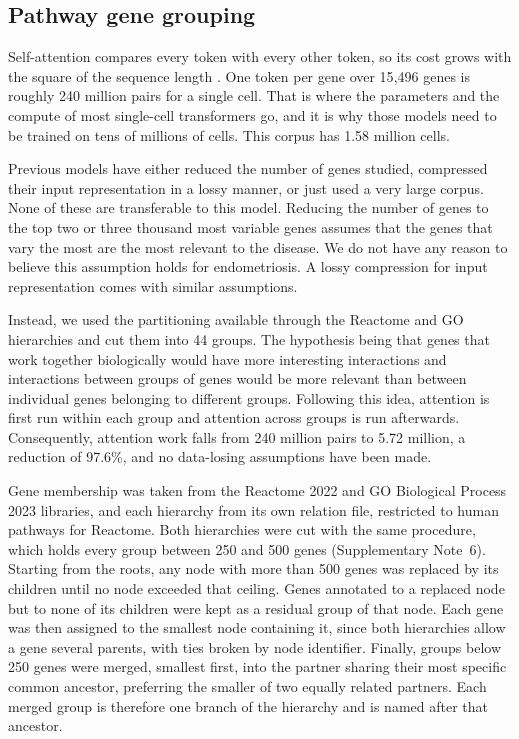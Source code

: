 \subsection*{Pathway gene grouping}

Self-attention compares every token with every other token, so its cost
grows with the square of the sequence length \citep{vaswani2017attention}. One token per gene over
15{,}496 genes is roughly 240 million pairs for a single cell. That is
where the parameters and the compute of most single-cell transformers go,
and it is why those models need to be trained on tens of millions of cells. 
This corpus has 1.58 million cells.

Previous models have either reduced the number of genes studied, compressed 
their input representation in a lossy manner, or just used a very large 
corpus. None of these are transferable to this model. Reducing the number 
of genes to the top two or three thousand most variable genes assumes that the 
genes that vary the most are the most relevant to the disease. We do not have 
any reason to believe this assumption holds for endometriosis. A lossy 
compression for input representation comes with similar assumptions.

Instead, we used the partitioning available through the Reactome and GO 
hierarchies and cut them into 44 groups. The hypothesis being that genes 
that work together biologically would have more interesting interactions 
and interactions between groups of genes would be more relevant than 
between individual genes belonging to different groups. Following this idea, 
attention is first run within each group and attention across groups is 
run afterwards. Consequently, attention work falls from 240 million pairs 
to 5.72 million, a reduction of 97.6\%, and no data-losing assumptions
have been made.

Gene membership was taken from the Reactome 2022 and GO Biological Process
2023 libraries, and each
hierarchy from its own relation file, restricted to human pathways for
Reactome. Both hierarchies were cut with the same procedure, which holds
every group between 250 and 500 genes (Supplementary Note~6). Starting from
the roots, any node with more than 500 genes was replaced by its children
until no node exceeded that ceiling. Genes annotated to a replaced node but
to none of its children were kept as a residual group of that node. Each
gene was then assigned to the smallest node containing it, since both
hierarchies allow a gene several parents, with ties broken by node
identifier. Finally, groups below 250 genes were merged, smallest first,
into the partner sharing their most specific common ancestor, preferring
the smaller of two equally related partners. Each merged group is therefore
one branch of the hierarchy and is named after that ancestor.

